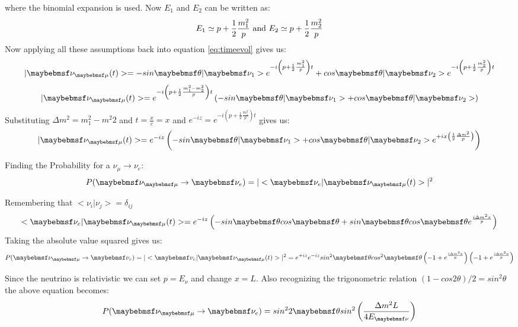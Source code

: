 where the binomial expansion is used. Now $E_{1}$ and $E_{2}$ can be written as:
\begin{equation}
\centering
E_{1} \simeq p + \frac{1}{2}\frac{m^2_{1}}{p} \mbox{    and    }  E_{2} \simeq p + \frac{1}{2}\frac{m^2_{2}}{p}
\end{equation} 
Now applying all these assumptions back into equation \ref{eq:timeevol} gives us:
\begin{equation}
\centering
|\nu_{\mu}(t)> = -sin\theta|\nu_{1}>e^{-i\left( p+\frac{1}{2}\frac{m^2_{1}}{p}\right)t} + cos\theta|\nu_{2}>e^{-i\left(p+\frac{1}{2}\frac{m^2_{2}}{p}\right)t}
\end{equation}
\begin{equation}
\centering
|\nu_{\mu}(t)> = e^{-i \left( p+\frac{1}{2}\frac{m^2_{1}-m^2_{2}}{p} \right) t} \left( -sin\theta|\nu_{1}> + cos\theta|\nu_{2}> \right)
\end{equation}
 Substituting $\Delta m^2 = m^2_{1}-m^2{2}$ and $t = \frac{x}{c} =x$ and $e^{-iz}= e^{-i \left( p+\frac{1}{2}\frac{m^2_{1}}{p} \right) t}$ gives us:
 \begin{equation}
 \centering
 |\nu_{\mu}(t)> = e^{-iz} \left( -sin\theta|\nu_{1}> + cos\theta|\nu_{2}>e^{+ix \left(\frac{1}{2}\frac{\Delta m^2}{p}\right)}\right)
 \end{equation}

Finding the Probability for a $\nu_{\mu} \rightarrow \nu_{e}$:
\begin{equation}
\centering
P(\nu_{\mu} \rightarrow \nu_{e}) = |<\nu_{e}|\nu_{\mu}(t)>|^2
\end{equation}

Remembering that $<\nu_{i}|\nu_{j}>=\delta_{ij}$
\begin{equation}
\centering
<\nu_{e}|\nu_{\mu}(t)> = e^{-iz}\left(-sin\theta cos\theta + sin\theta cos\theta e^{\frac{i \Delta m^2 x}{p}}\right)
\end{equation}
Taking the absolute value squared gives us:
\begin{equation}
\centering
P(\nu_{\mu} \rightarrow \nu_{e}) = |<\nu_{e}|\nu_{\mu}(t)>|^2 = e^{+iz}e^{-iz}sin^{2}\theta cos^{2}\theta\left( -1 + e^{\frac{i \Delta m^2 x}{p}}\right)\left(-1 + e^{\frac{i \Delta m^2 x}{p}}\right)
\end{equation}

Since the neutrino is relativistic we can set $p= E_{\nu}$ and change $x=L$. Also recognizing the trigonometric relation $(1 - cos2\theta)/2 = sin^{2}\theta$ the above equation becomes:
\begin{equation}
\centering
P(\nu_{\mu} \rightarrow \nu_{e}) = sin^{2}2\theta sin^2\left(\frac{\Delta m^2 L}{4 E_{\nu}}\right)
\end{equation}
 
